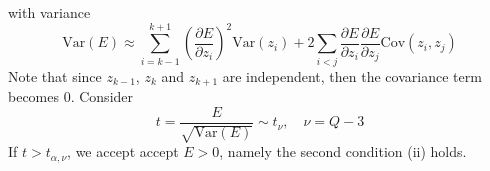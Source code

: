 with variance
\[
\text{Var}(E)\approx \sum_{i=k-1}^{k+1}\left(\frac{\partial E}{\partial z_i}\right)^2 \text{Var}(z_i) + 2\sum_{i<j}\frac{\partial E}{\partial z_i}\frac{\partial E}{\partial z_j}\text{Cov}(z_i,z_j)
\]
Note that since $z_{k-1}$, $z_k$ and $z_{k+1}$ are independent, then the covariance term becomes 0. Consider
\[
t=\frac{E}{\sqrt{\text{Var}(E)}} \sim t_\nu, \quad \nu = Q-3
\]
If $t>t_{\alpha,\nu}$, we accept accept $E>0$, namely the second condition (ii) holds.








    

   
   
   


